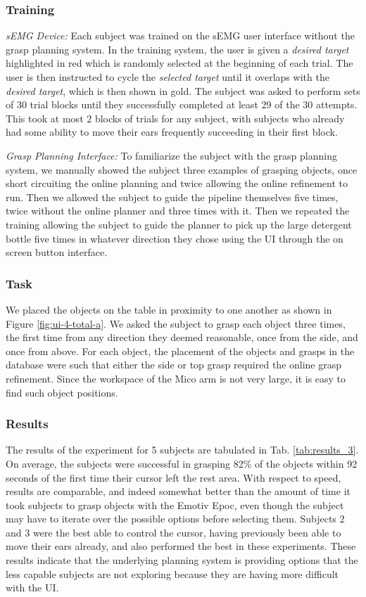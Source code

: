 \subsubsection{Training}
\emph{sEMG Device:} Each subject was trained on the sEMG user interface without the grasp planning system. In the training system, the user is given a \emph{desired target} highlighted in red which is randomly selected at the beginning of each trial. The user is then instructed to cycle the \emph{selected target} until it overlaps with the \emph{desired target}, which is then shown in gold. The subject was asked to perform sets of 30 trial blocks until they successfully completed at least 29 of the 30 attempts. This took at most 2 blocks of trials for any subject, with subjects who already had some ability to move their ears frequently succeeding in their first block. 

\emph{Grasp Planning Interface:} To familiarize the subject with the grasp planning system, we manually showed the subject three examples of grasping objects, once short circuiting the online planning and twice allowing the online refinement to run. Then we allowed the subject to guide the pipeline themselves five times, twice without the online planner and three times with it. Then we repeated the training allowing the subject to guide the planner to pick up the large detergent bottle five times in whatever direction they chose using the UI through the on screen button interface. 

\subsubsection{Task}
We placed the objects on the table in proximity to one another as shown in Figure \ref{fig:ui-4-total-a}. We asked the subject to grasp each object three times, the first time from any direction they deemed reasonable, once from the side, and once from above. For each object, the placement of the objects and grasps in the database were such that either the side or top grasp required the online grasp refinement. Since the workspace of the Mico arm is not very large, it is easy to find such object positions. 

\subsubsection{Results}
\label{sec:semg_results}
The results of the experiment for 5 subjects are tabulated in Tab. \ref{tab:results_3}. On average, the subjects were successful in grasping 82\% of the objects within 92 seconds of the first time their cursor left the rest area. With respect to speed,  results are comparable, and indeed somewhat better than the amount of time it took subjects to grasp objects with the Emotiv Epoc, even though the subject may have to iterate over the possible options before selecting them. Subjects 2 and 3 were the best able to control the cursor, having previously been able to move their ears already, and also performed the best in these experiments. These results indicate that the underlying planning system is providing options that the less capable subjects are not exploring because they are having more difficult with the UI. 

